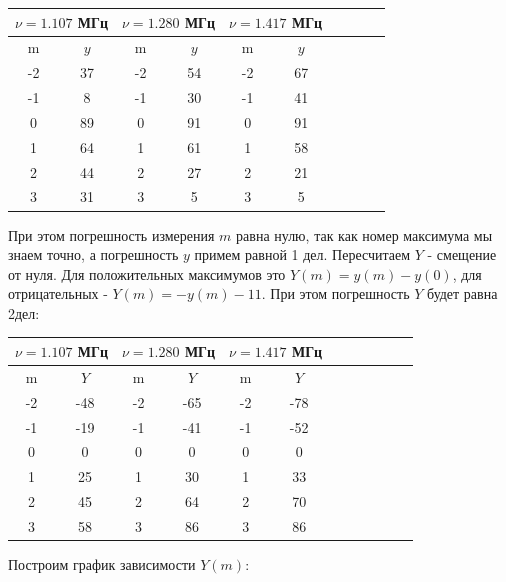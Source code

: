 \documentclass[14pt]{article}
\begin{document}
\begin{center}
\begin{tabular}{|c|c|c|c|c|c|c|c|c|c|}
\hline
\multicolumn{2}{|c|}{$\nu = 1.107$ МГц}	&	\multicolumn{2}{|c|}{$\nu = 1.280$ МГц}	&	\multicolumn{2}{|c|}{$\nu = 1.417$ МГц}\\
\hline
m	&	$y$	&	m	&	$y$	&	m	&	$y$	\\
\hline
-2	&	37	&	-2	&	54	&	-2	&	67	\\
\hline
-1	&	8	&	-1	&	30	&	-1	&	41	\\
\hline
0	&	89	&	0	&	91	&	0	&	91	\\
\hline
1	&	64	&	1	&	61	&	1	&	58	\\
\hline
2	&	44	&	2	&	27	&	2	&	21	\\
\hline
3	&	31	&	3	&	5	&	3	&	5	\\
\hline
\end{tabular}
\end{center}

При этом погрешность измерения $m$ равна нулю, так как номер максимума мы знаем точно, а погрешность $y$ примем равной 1 дел.
Пересчитаем $Y$ - смещение от нуля. Для положительных максимумов это $Y(m) = y(m) - y(0)$, для отрицательных - $Y(m) = -y(m) - 11$. При этом погрешность $Y$ будет равна 2дел:

\begin{center}
\begin{tabular}{|c|c|c|c|c|c|c|c|c|c|c|c|}
\hline
\multicolumn{2}{|c|}{$\nu = 1.107$ МГц}	&	\multicolumn{2}{|c|}{$\nu = 1.280$ МГц}	&	\multicolumn{2}{|c|}{$\nu = 1.417$ МГц}\\
\hline
m	&	$Y$	&	m	&	$Y$	&	m	&	$Y$	\\
\hline
-2	&	-48	&	-2	&	-65	&	-2	&	-78	\\
\hline
-1	&	-19	&	-1	&	-41	&	-1	&	-52	\\
\hline
0	&	0	&	0	&	0	&	0	&	0	\\
\hline
1	&	25	&	1	&	30	&	1	&	33	\\
\hline
2	&	45	&	2	&	64	&	2	&	70	\\
\hline
3	&	58	&	3	&	86	&	3	&	86	\\
\hline
\end{tabular}
\end{center}

Построим график зависимости $Y(m)$:
\end{document}
